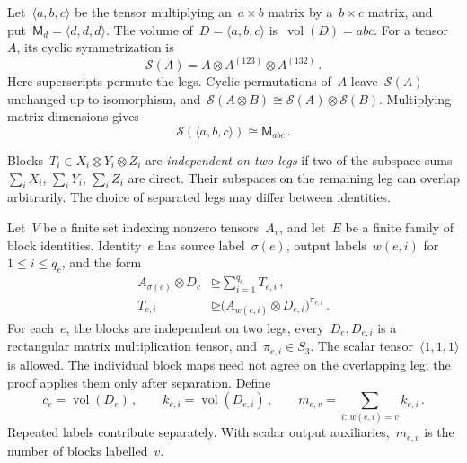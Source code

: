 \documentclass[11pt,letterpaper]{article}
\theoremstyle{definition}
\numberwithin{equation}{section}
\newcommand{\MM}{\mathsf M}
\newcommand{\degen}{\unrhd}
\begin{document}
Let~$\langle a,b,c\rangle$ be the tensor multiplying an~$a\times b$ matrix by a~$b\times c$ matrix, and put~$\MM_d=\langle d,d,d\rangle$. The volume of~$D=\langle a,b,c\rangle$ is~$\operatorname{vol}(D)=abc$. For a tensor~$A$, its cyclic symmetrization is
\begin{equation*}
 \mathcal S(A)=A\otimes A^{(123)}\otimes A^{(132)}\,.
\end{equation*}
Here superscripts permute the legs. Cyclic permutations of~$A$ leave~$\mathcal S(A)$ unchanged up to isomorphism, and~$\mathcal S(A\otimes B)\cong\mathcal S(A)\otimes\mathcal S(B)$. Multiplying matrix dimensions gives
\begin{equation}\label{eq:rectangular-balancing}
 \mathcal S(\langle a,b,c\rangle)\cong\MM_{abc}\,.
\end{equation}

Blocks~$T_i\in X_i\otimes Y_i\otimes Z_i$ are \emph{independent on two legs} if two of the subspace sums~$\sum_iX_i$, $\sum_iY_i$, $\sum_iZ_i$ are direct. Their subspaces on the remaining leg can overlap arbitrarily. The choice of separated legs may differ between identities.

Let~$V$ be a finite set indexing nonzero tensors~$A_v$, and let~$E$ be a finite family of block identities. Identity~$e$ has source label~$\sigma(e)$, output labels~$w(e,i)$ for~$1\leq i\leq q_e$, and the form
\begin{equation}\label{eq:identity-system}
 \begin{aligned}
 A_{\sigma(e)}\otimes D_e&\degen\sum_{i=1}^{q_e}T_{e,i}\,,\\
 T_{e,i}&\degen\bigl(A_{w(e,i)}\otimes D_{e,i}\bigr)^{\pi_{e,i}}\,.
 \end{aligned}
\end{equation}
For each~$e$, the blocks are independent on two legs, every~$D_e,D_{e,i}$ is a rectangular matrix multiplication tensor, and~$\pi_{e,i}\in S_3$. The scalar tensor~$\langle1,1,1\rangle$ is allowed. The individual block maps need not agree on the overlapping leg; the proof applies them only after separation. Define
\begin{equation}\label{eq:weighted-multiplicities}
 c_e=\operatorname{vol}(D_e)\,,\qquad
 k_{e,i}=\operatorname{vol}(D_{e,i})\,,\qquad
 m_{e,v}=\sum_{i:\,w(e,i)=v}k_{e,i}\,.
\end{equation}
Repeated labels contribute separately. With scalar output auxiliaries,~$m_{e,v}$ is the number of blocks labelled~$v$.
\end{document}
